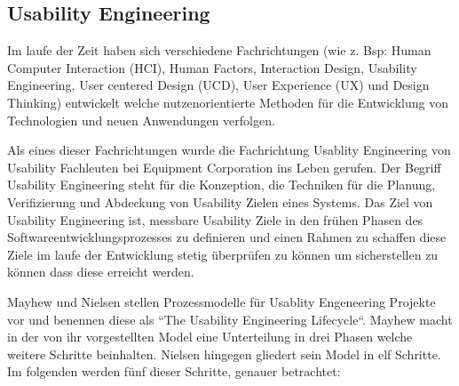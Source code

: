 \subsection{Usability Engineering}\label{UsaEng}

\cite[S.~7]{MichaelRichter2016} Im laufe der Zeit haben sich verschiedene Fachrichtungen (wie z. Bsp: Human Computer Interaction (HCI), Human Factors, Interaction Design, Usability Engineering, 
User centered Design (UCD), User Experience (UX) und Design Thinking) entwickelt welche nutzenorientierte Methoden für die Entwicklung von Technologien und neuen Anwendungen verfolgen. 

\cite[S.~14]{MaryBethRossonJohnM.CarrollDianeD.Cerra2002} Als eines dieser Fachrichtungen wurde die Fachrichtung Usablity Engineering von Usability Fachleuten bei Equipment Corporation ins Leben gerufen.  
Der Begriff Usability Engineering steht für die Konzeption, die Techniken für die Planung, Verifizierung und Abdeckung von Usability Zielen eines Systems. Das Ziel von Usability Engineering ist, 
messbare Usability Ziele in den frühen Phasen des Softwareentwicklungsprozesses zu definieren und einen Rahmen zu schaffen diese Ziele im laufe der Entwicklung stetig überprüfen zu können 
um sicherstellen zu können dass diese erreicht werden.

Mayhew \cite{Mayhew1999} und Nielsen \cite{Nielsen1994} stellen Prozessmodelle für Usablity Engeneering Projekte vor und benennen diese als ``The Usability Engineering Lifecycle``. Mayhew macht in der von ihr vorgestellten Model eine Unterteilung in drei Phasen welche weitere Schritte beinhalten. Nielsen hingegen gliedert sein Model in elf Schritte. Im folgenden werden fünf 
dieser Schritte, genauer betrachtet: 

